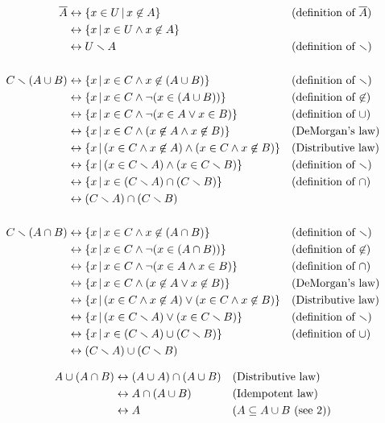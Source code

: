 \begin{solutions}
	
	\solution\begin{align*}
	\overline{A}&\leftrightarrow \{x\in U\,|\, x\not\in A\} &&\text{(definition of $\overline{A}$)}\\
	&\leftrightarrow \{x\,|\, x\in U \wedge x\not\in A\}\\
	&\leftrightarrow U\smallsetminus A&&\text{(definition of $\smallsetminus$)}\\ \\
	C\smallsetminus (A\cup B)&\leftrightarrow \{x\,|\, x\in C \wedge x\not\in (A\cup B)\} &&\text{(definition of $\smallsetminus$)}\\
	&\leftrightarrow \{x\,|\, x\in C\wedge\lnot (x\in (A\cup B))\}&&\text{(definition of $\not\in$)}\\
	&\leftrightarrow \{x\,|\, x\in C\wedge\lnot (x\in A\vee x\in B)\}&&\text{(definition of $\cup$)}\\
	&\leftrightarrow \{x\,|\, x\in C \wedge (x\not\in A \wedge x\not\in B)\}&&\text{(DeMorgan's law)}\\
	&\leftrightarrow \{x\,|\, (x\in C\wedge x\not\in A)\wedge (x\in C\wedge x\not\in B)\}&&\text{(Distributive law)}\\
	&\leftrightarrow \{x\,|\, (x\in C\smallsetminus A)\wedge (x\in C\smallsetminus B)\}&&\text{(definition of $\smallsetminus$)}\\
	&\leftrightarrow \{x\,|\, x\in (C\smallsetminus A)\cap (C\smallsetminus B)\}&&\text{(definition of $\cap$)}\\
	&\leftrightarrow (C\smallsetminus A)\cap (C\smallsetminus B)\\ \\
	C\smallsetminus (A\cap B)&\leftrightarrow \{x\,|\, x\in C \wedge x\not\in (A\cap B)\} &&\text{(definition of $\smallsetminus$)}\\
	&\leftrightarrow \{x\,|\, x\in C\wedge\lnot (x\in (A\cap B))\}&&\text{(definition of $\not\in$)}\\
	&\leftrightarrow \{x\,|\, x\in C\wedge\lnot (x\in A\wedge x\in B)\}&&\text{(definition of $\cap$)}\\
	&\leftrightarrow \{x\,|\, x\in C \wedge (x\not\in A \vee x\not\in B)\}&&\text{(DeMorgan's law)}\\
	&\leftrightarrow \{x\,|\, (x\in C\wedge x\not\in A)\vee (x\in C\wedge x\not\in B)\}&&\text{(Distributive law)}\\
	&\leftrightarrow \{x\,|\, (x\in C\smallsetminus A)\vee (x\in C\smallsetminus B)\}&&\text{(definition of $\smallsetminus$)}\\
	&\leftrightarrow \{x\,|\, x\in (C\smallsetminus A)\cup (C\smallsetminus B)\}&&\text{(definition of $\cup$)}\\
	&\leftrightarrow (C\smallsetminus A)\cup (C\smallsetminus B)
	\end{align*}

	\solution\begin{align*}
	A\cup (A\cap B)&\leftrightarrow (A\cup A)\cap (A\cup B)&&\text{(Distributive law)}\\
	&\leftrightarrow A\cap (A\cup B)&&\text{(Idempotent law)}\\
	&\leftrightarrow A &&\text{($A\subseteq A\cup B$ (see 2))}
	\end{align*}


\end{solutions}
